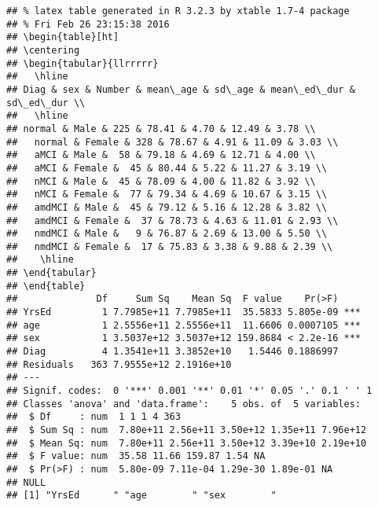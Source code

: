 \documentclass[12pt]{article}\usepackage[]{graphicx}\usepackage[]{color}
\makeatletter
\newenvironment{kframe}{%
 \def\at@end@of@kframe{}%
 \ifinner\ifhmode%
  \def\at@end@of@kframe{\end{minipage}}%
  \begin{minipage}{\columnwidth}%
 \fi\fi%
 \def\FrameCommand##1{\hskip\@totalleftmargin \hskip-\fboxsep
 \colorbox{shadecolor}{##1}\hskip-\fboxsep
     \hskip-\linewidth \hskip-\@totalleftmargin \hskip\columnwidth}%
 \MakeFramed {\advance\hsize-\width
   \@totalleftmargin\z@ \linewidth\hsize
   \@setminipage}}%
 {\par\unskip\endMakeFramed%
 \at@end@of@kframe}
\newenvironment{knitrout}{}{} %
\makeatother
\begin{document}
\begin{knitrout}
\color{fgcolor}\begin{kframe}
\begin{verbatim}
## % latex table generated in R 3.2.3 by xtable 1.7-4 package
## % Fri Feb 26 23:15:38 2016
## \begin{table}[ht]
## \centering
## \begin{tabular}{llrrrrr}
##   \hline
## Diag & sex & Number & mean\_age & sd\_age & mean\_ed\_dur & sd\_ed\_dur \\ 
##   \hline
## normal & Male & 225 & 78.41 & 4.70 & 12.49 & 3.78 \\ 
##   normal & Female & 328 & 78.67 & 4.91 & 11.09 & 3.03 \\ 
##   aMCI & Male &  58 & 79.18 & 4.69 & 12.71 & 4.00 \\ 
##   aMCI & Female &  45 & 80.44 & 5.22 & 11.27 & 3.19 \\ 
##   nMCI & Male &  45 & 78.09 & 4.00 & 11.82 & 3.92 \\ 
##   nMCI & Female &  77 & 79.34 & 4.69 & 10.67 & 3.15 \\ 
##   amdMCI & Male &  45 & 79.12 & 5.16 & 12.28 & 3.82 \\ 
##   amdMCI & Female &  37 & 78.73 & 4.63 & 11.01 & 2.93 \\ 
##   nmdMCI & Male &   9 & 76.87 & 2.69 & 13.00 & 5.50 \\ 
##   nmdMCI & Female &  17 & 75.83 & 3.38 & 9.88 & 2.39 \\ 
##    \hline
## \end{tabular}
## \end{table}
##              Df     Sum Sq    Mean Sq  F value    Pr(>F)    
## YrsEd         1 7.7985e+11 7.7985e+11  35.5833 5.805e-09 ***
## age           1 2.5556e+11 2.5556e+11  11.6606 0.0007105 ***
## sex           1 3.5037e+12 3.5037e+12 159.8684 < 2.2e-16 ***
## Diag          4 1.3541e+11 3.3852e+10   1.5446 0.1886997    
## Residuals   363 7.9555e+12 2.1916e+10                       
## ---
## Signif. codes:  0 '***' 0.001 '**' 0.01 '*' 0.05 '.' 0.1 ' ' 1
## Classes 'anova' and 'data.frame':	5 obs. of  5 variables:
##  $ Df     : num  1 1 1 4 363
##  $ Sum Sq : num  7.80e+11 2.56e+11 3.50e+12 1.35e+11 7.96e+12
##  $ Mean Sq: num  7.80e+11 2.56e+11 3.50e+12 3.39e+10 2.19e+10
##  $ F value: num  35.58 11.66 159.87 1.54 NA
##  $ Pr(>F) : num  5.80e-09 7.11e-04 1.29e-30 1.89e-01 NA
## NULL
## [1] "YrsEd      " "age        " "sex        "
\end{verbatim}
\end{kframe}
\end{knitrout}
\end{document}
